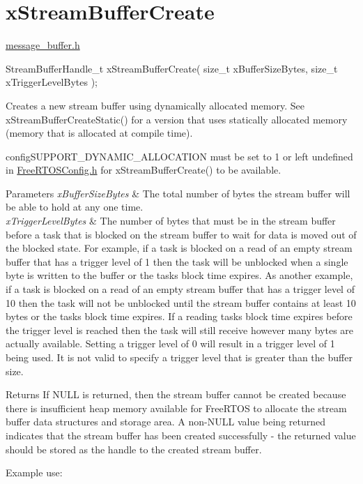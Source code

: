 \hypertarget{group__x_stream_buffer_create}{}\section{x\+Stream\+Buffer\+Create}
\label{group__x_stream_buffer_create}
\mbox{\hyperlink{message__buffer_8h_source}{message\+\_\+buffer.\+h}}


\begin{DoxyPre}
StreamBufferHandle\_t xStreamBufferCreate( size\_t xBufferSizeBytes, size\_t xTriggerLevelBytes );
\end{DoxyPre}


Creates a new stream buffer using dynamically allocated memory. See x\+Stream\+Buffer\+Create\+Static() for a version that uses statically allocated memory (memory that is allocated at compile time).

config\+S\+U\+P\+P\+O\+R\+T\+\_\+\+D\+Y\+N\+A\+M\+I\+C\+\_\+\+A\+L\+L\+O\+C\+A\+T\+I\+ON must be set to 1 or left undefined in \mbox{\hyperlink{_free_r_t_o_s_config_8h_source}{Free\+R\+T\+O\+S\+Config.\+h}} for x\+Stream\+Buffer\+Create() to be available.


\begin{DoxyParams}{Parameters}
{\em x\+Buffer\+Size\+Bytes} & The total number of bytes the stream buffer will be able to hold at any one time.\\
\hline
{\em x\+Trigger\+Level\+Bytes} & The number of bytes that must be in the stream buffer before a task that is blocked on the stream buffer to wait for data is moved out of the blocked state. For example, if a task is blocked on a read of an empty stream buffer that has a trigger level of 1 then the task will be unblocked when a single byte is written to the buffer or the task\textquotesingle{}s block time expires. As another example, if a task is blocked on a read of an empty stream buffer that has a trigger level of 10 then the task will not be unblocked until the stream buffer contains at least 10 bytes or the task\textquotesingle{}s block time expires. If a reading task\textquotesingle{}s block time expires before the trigger level is reached then the task will still receive however many bytes are actually available. Setting a trigger level of 0 will result in a trigger level of 1 being used. It is not valid to specify a trigger level that is greater than the buffer size.\\
\hline
\end{DoxyParams}
\begin{DoxyReturn}{Returns}
If N\+U\+LL is returned, then the stream buffer cannot be created because there is insufficient heap memory available for Free\+R\+T\+OS to allocate the stream buffer data structures and storage area. A non-\/\+N\+U\+LL value being returned indicates that the stream buffer has been created successfully -\/ the returned value should be stored as the handle to the created stream buffer.
\end{DoxyReturn}
Example use\+: 
\begin{DoxyPre}\end{DoxyPre}



